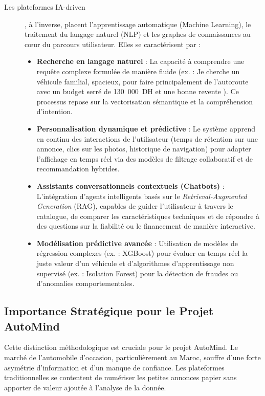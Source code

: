 \documentclass[11pt,a4paper]{article}
\begin{document}
\begin{description}
    \item[Les plateformes IA-driven], à l'inverse, placent l'apprentissage automatique (Machine Learning), le traitement du langage naturel (NLP) et les graphes de connaissances au c{\oe}ur du parcours utilisateur. Elles se caractérisent par :
    \begin{itemize}
        \item \textbf{Recherche en langage naturel} : La capacité à comprendre une requête complexe formulée de manière fluide (ex. : \og Je cherche un véhicule familial, spacieux, pour faire principalement de l'autoroute avec un budget serré de 130~000~DH et une bonne revente \fg). Ce processus repose sur la vectorisation sémantique et la compréhension d'intention.
        \item \textbf{Personnalisation dynamique et prédictive} : Le système apprend en continu des interactions de l'utilisateur (temps de rétention sur une annonce, clics sur les photos, historique de navigation) pour adapter l'affichage en temps réel via des modèles de filtrage collaboratif et de recommandation hybrides.
        \item \textbf{Assistants conversationnels contextuels (Chatbots)} : L'intégration d'agents intelligents basés sur le \textit{Retrieval-Augmented Generation} (RAG), capables de guider l'utilisateur à travers le catalogue, de comparer les caractéristiques techniques et de répondre à des questions sur la fiabilité ou le financement de manière interactive.
        \item \textbf{Modélisation prédictive avancée} : Utilisation de modèles de régression complexes (ex. : XGBoost) pour évaluer en temps réel la juste valeur d'un véhicule et d'algorithmes d'apprentissage non supervisé (ex. : Isolation Forest) pour la détection de fraudes ou d'anomalies comportementales.
    \end{itemize}
\end{description}

\subsection{Importance Stratégique pour le Projet AutoMind}
Cette distinction méthodologique est cruciale pour le projet AutoMind. Le marché de l'automobile d'occasion, particulièrement au Maroc, souffre d'une forte asymétrie d'information et d'un manque de confiance. Les plateformes traditionnelles se contentent de numériser les petites annonces papier sans apporter de valeur ajoutée à l'analyse de la donnée. 
\end{document}
